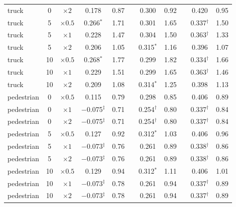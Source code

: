\documentclass[10pt,letterpaper]{article}
\theoremstyle{remark}
\theoremstyle{plain}
\theoremstyle{definition}
\begin{document}
\begin{table}[!htbp]
\begin{tabular}{@{}lcccccccccc@{}}
truck & 0 & $\times2$ & 0.178 & 0.87 & & 0.300 & 0.92 & & 0.420 & 0.95 \\
truck & 5 & $\times0.5$ & 0.266$^{\ast}$ & 1.71 & & 0.301 & 1.65 & & 0.337$^{\dagger}$ & 1.50 \\
truck & 5 & $\times1$ & 0.228 & 1.47 & & 0.304 & 1.50 & & 0.363$^{\dagger}$ & 1.33 \\
truck & 5 & $\times2$ & 0.206 & 1.05 & & 0.315$^{\ast}$ & 1.16 & & 0.396 & 1.07 \\
truck & 10 & $\times0.5$ & 0.268$^{\ast}$ & 1.77 & & 0.299 & 1.82 & & 0.334$^{\dagger}$ & 1.66 \\
truck & 10 & $\times1$ & 0.229 & 1.51 & & 0.299 & 1.65 & & 0.363$^{\dagger}$ & 1.46 \\
truck & 10 & $\times2$ & 0.209 & 1.08 & & 0.314$^{\ast}$ & 1.25 & & 0.398 & 1.13 \\
pedestrian & 0 & $\times0.5$ & 0.115 & 0.79 & & 0.298 & 0.85 & & 0.406 & 0.89 \\
pedestrian & 0 & $\times1$ & $-$0.075$^{\ddagger}$ & 0.71 & & 0.254$^{\dagger}$ & 0.80 & & 0.337$^{\dagger}$ & 0.84 \\
pedestrian & 0 & $\times2$ & $-$0.075$^{\ddagger}$ & 0.71 & & 0.254$^{\dagger}$ & 0.80 & & 0.337$^{\dagger}$ & 0.84 \\
pedestrian & 5 & $\times0.5$ & 0.127 & 0.92 & & 0.312$^{\ast}$ & 1.03 & & 0.406 & 0.96 \\
pedestrian & 5 & $\times1$ & $-$0.073$^{\ddagger}$ & 0.76 & & 0.261 & 0.89 & & 0.338$^{\dagger}$ & 0.86 \\
pedestrian & 5 & $\times2$ & $-$0.073$^{\ddagger}$ & 0.76 & & 0.261 & 0.89 & & 0.338$^{\dagger}$ & 0.86 \\
pedestrian & 10 & $\times0.5$ & 0.129 & 0.94 & & 0.312$^{\ast}$ & 1.11 & & 0.406 & 1.01 \\
pedestrian & 10 & $\times1$ & $-$0.073$^{\ddagger}$ & 0.78 & & 0.261 & 0.94 & & 0.337$^{\dagger}$ & 0.89 \\
pedestrian & 10 & $\times2$ & $-$0.073$^{\ddagger}$ & 0.78 & & 0.261 & 0.94 & & 0.337$^{\dagger}$ & 0.89 \\
\bottomrule
\end{tabular}
\end{table}
\end{document}
